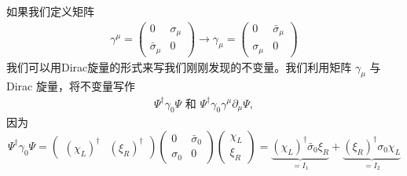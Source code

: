 如果我们定义矩阵
\begin{align}
\label{equ6.13}
\gamma^\mu=\begin{pmatrix}0&\sigma_\mu\\\bar\sigma_\mu&0\end{pmatrix}\to\gamma_\mu=\begin{pmatrix}0&\bar\sigma_\mu\\\sigma_\mu&0\end{pmatrix}
\end{align}
我们可以用Dirac旋量的形式来写我们刚刚发现的不变量。我们利用矩阵 $\gamma_\mu$ 与 Dirac 旋量，将不变量写作
\begin{align}
\label{equ6.14}
\Psi^\dagger\gamma_0\Psi \text{\ \ 和\ \ }\Psi^\dagger\gamma_0\gamma^\mu\partial_\mu\Psi,
\end{align}
因为
\[\Psi^\dagger \gamma_0 \Psi = 
    \begin{pmatrix}
        (\chi_L)^\dagger&(\xi_R)^\dagger
    \end{pmatrix}
    \begin{pmatrix}
    0 & \bar\sigma_0\\
    \sigma_0 & 0
    \end{pmatrix}
    \begin{pmatrix}
    \chi_L\\
    \xi_R
    \end{pmatrix} =
\underbrace{(\chi_L)^\dagger \bar\sigma_0\xi_R}_{=I_1}+\underbrace{(\xi_R)^\dagger\sigma_0\chi_L}_{=I_2} \]
